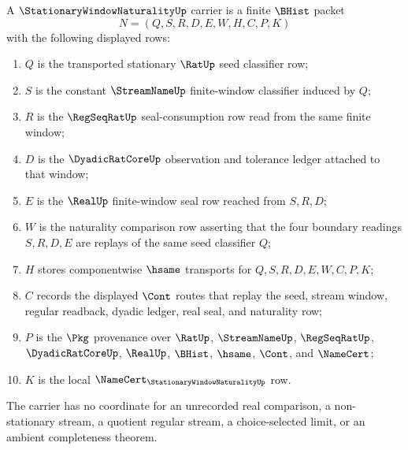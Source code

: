 \begin{definition}
\label{def:stationary-window-naturality-carrier}
A $\StationaryWindowNaturalityUp$ carrier is a finite $\BHist$ packet
$$
N=(Q,S,R,D,E,W,H,C,P,K)
$$
with the following displayed rows:
\begin{enumerate}
\item $Q$ is the transported stationary $\RatUp$ seed classifier row;
\item $S$ is the constant $\StreamNameUp$ finite-window classifier induced by $Q$;
\item $R$ is the $\RegSeqRatUp$ seal-consumption row read from the same finite window;
\item $D$ is the $\DyadicRatCoreUp$ observation and tolerance ledger attached to that window;
\item $E$ is the $\RealUp$ finite-window seal row reached from $S,R,D$;
\item $W$ is the naturality comparison row asserting that the four boundary readings $S,R,D,E$ are replays of the same seed classifier $Q$;
\item $H$ stores componentwise $\hsame$ transports for $Q,S,R,D,E,W,C,P,K$;
\item $C$ records the displayed $\Cont$ routes that replay the seed, stream window, regular readback, dyadic ledger, real seal, and naturality row;
\item $P$ is the $\Pkg$ provenance over $\RatUp$, $\StreamNameUp$, $\RegSeqRatUp$, $\DyadicRatCoreUp$, $\RealUp$, $\BHist$, $\hsame$, $\Cont$, and $\NameCert$;
\item $K$ is the local $\NameCert_{\StationaryWindowNaturalityUp}$ row.
\end{enumerate}
The carrier has no coordinate for an unrecorded real comparison, a non-stationary stream, a quotient regular stream, a choice-selected limit, or an ambient completeness theorem.
\end{definition}

